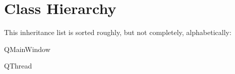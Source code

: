 \section{Class Hierarchy}
This inheritance list is sorted roughly, but not completely, alphabetically\+:\begin{DoxyCompactList}
\item Q\+Main\+Window\begin{DoxyCompactList}
\item {}
\end{DoxyCompactList}
\item Q\+Thread\begin{DoxyCompactList}
\item {}
\end{DoxyCompactList}
\item {}
\begin{DoxyCompactList}
\item {}
\end{DoxyCompactList}
\end{DoxyCompactList}
